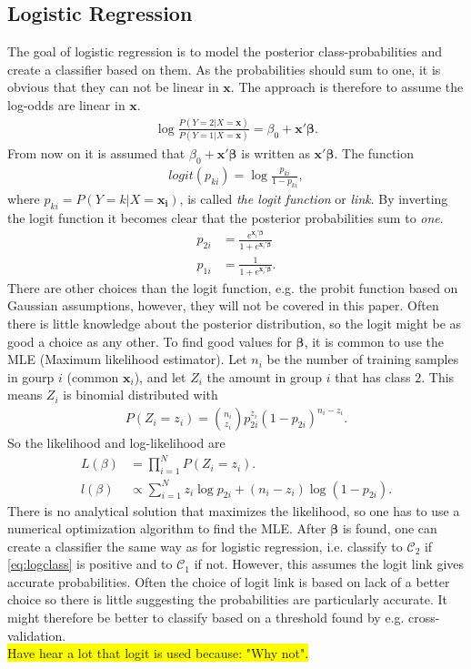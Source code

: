 \subsection{Logistic Regression}
\label{sub:Logistic Regression}
The goal of logistic regression is to model the posterior class-probabilities and create a classifier based on them. As the probabilities should sum to one, it is obvious that they can not be linear in $\mathbf{x}$. The approach is therefore to assume the log-odds are linear in $\mathbf{x}$. 
\begin{align}
  \label{eq:logclass} 
   \log \frac{P(Y=2|X=\mathbf{x})}{P(Y=1|X=\mathbf{x})} = \beta_0 + \mathbf{x}'\bm \beta.
\end{align}
From now on it is assumed that $\beta_0 + \mathbf{x}' \bm \beta$ is written as $\mathbf{x}' \bm \beta$.
The function
\begin{align}
  logit(p_{ki}) = \log  \frac{p_{ki}}{1-p_{ki}},
\end{align}
where $p_{ki} = P(Y=k|X=\mathbf{x_i})$, is called \textit{the logit function} or \textit{link}. By inverting the logit function it becomes clear that the posterior probabilities sum to \textit{one}.
\begin{align}
  p_{2i} &=  \frac{e^{\mathbf{x}_i'\bm \beta}}{1 + e^{\mathbf{x}_i'\bm \beta}} \\
  p_{1i} &=  \frac{1}{1 + e^{\mathbf{x}_i'\bm \beta}}.
\end{align}
There are other choices than the logit function, e.g. the probit function based on Gaussian assumptions, however, they will not be covered in this paper. 
Often there is little knowledge about the posterior distribution, so the logit might be as good a choice as any other. 
To find good values for $\bm \beta$, it is common to use the MLE (Maximum likelihood estimator). Let $n_i$ be the number of training samples in gourp $i$ (common $\mathbf{x}_i$), and let $Z_i$ the amount in group $i$ that has class $2$. This means $Z_i$ is binomial distributed with
\begin{align}
  P(Z_i = z_i) = \binom{n_i}{z_i} p_{2i}^{z_i} (1-p_{2i})^{n_i - z_i}.
\end{align}
So the likelihood and log-likelihood are
\begin{align}
  L(\beta) &= \prod_{i = 1}^{N} P(Z_i = z_i). \\
  l(\beta) &\propto \sum^{N}_{i=1} z_i \log p_{2i} + (n_i - z_i) \log (1- p_{2i}).
\end{align}
There is no analytical solution that maximizes the likelihood, so one has to use a numerical optimization algorithm to find the MLE.  
After $\bm \beta$ is found, one can create a classifier the same way as for logistic regression, i.e. classify to $\mathcal{C}_2$ if \eqref{eq:logclass} is positive and to $\mathcal{C}_1$ if not. However, this assumes the logit link gives accurate probabilities. Often the choice of logit link is based on lack of a better choice so there is little suggesting the probabilities are particularly accurate. It might therefore be better to classify based on a threshold found by e.g. cross-validation. 
\\\colorbox{yellow}{Have hear a lot that logit is used because: "Why not".}
%
